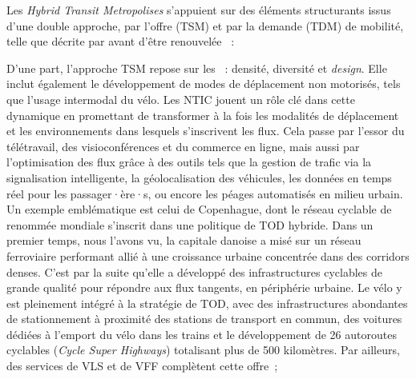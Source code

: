 \begin{refsegment}
Les \textsl{Hybrid Transit Metropolises} s’appuient sur des éléments structurants issus d’une double approche, par l’offre (\acrshort{TSM}) et par la demande (\acrshort{TDM}) de mobilité, telle que décrite par \textcolor{blue}{\textcite[67]{cervero_transit_1998}} avant d'être renouvelée \textcolor{blue}{\autocite[137-143]{cervero_transit_2020}}~:
    \begin{customitemize}
\item D’une part, l’approche \acrshort{TSM} repose sur les ~: densité, diversité et \textsl{design}. Elle inclut également le développement de modes de déplacement non motorisés, tels que l’usage intermodal du vélo. Les \acrshort{NTIC} jouent un rôle clé dans cette dynamique en promettant de transformer à la fois les modalités de déplacement et les environnements dans lesquels s’inscrivent les flux. Cela passe par l’essor du télétravail, des visioconférences et du commerce en ligne, mais aussi par l’optimisation des flux grâce à des outils tels que la gestion de trafic via la signalisation intelligente, la géolocalisation des véhicules, les données en temps réel pour les passager·ère·s, ou encore les péages automatisés en milieu urbain. Un exemple emblématique est celui de Copenhague, dont le réseau cyclable de renommée mondiale s’inscrit dans une politique de \acrshort{TOD} hybride. Dans un premier temps, nous l'avons vu, la capitale danoise a misé sur un réseau ferroviaire performant allié à une croissance urbaine concentrée dans des corridors denses. C'est par la suite qu'elle a développé des infrastructures cyclables de grande qualité pour répondre aux flux tangents, en périphérie urbaine. Le vélo y est pleinement intégré à la stratégie de \acrshort{TOD}, avec des infrastructures abondantes de stationnement à proximité des stations de transport en commun, des voitures dédiées à l'emport du vélo dans les trains et le développement de 26 autoroutes cyclables (\textsl{Cycle Super Highways}) totalisant plus de 500 kilomètres. Par ailleurs, des services de \acrshort{VLS} et de \acrshort{VFF} complètent cette offre~;

\end{customitemize}
\end{refsegment}
